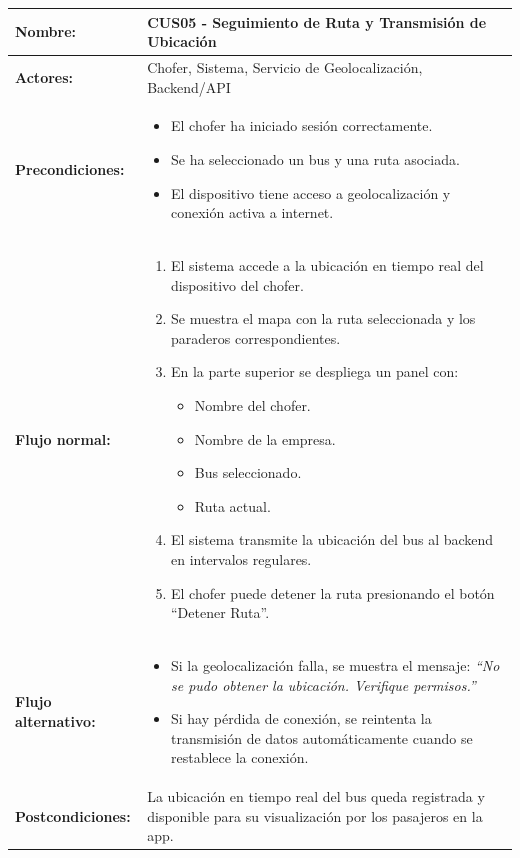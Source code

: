 \documentclass[12pt]{article}
\begin{document}
    \clearpage
    \begin{table}[!h]
    \centering
    \begin{tabular}{|p{3.5cm}|p{11cm}|}
    \hline
    \textbf{Nombre:} & CUS05 - Seguimiento de Ruta y Transmisión de Ubicación \\
    \hline
    \textbf{Actores:} & Chofer, Sistema, Servicio de Geolocalización, Backend/API \\
    \hline
    \textbf{Precondiciones:} &
    \begin{itemize}
        \item El chofer ha iniciado sesión correctamente.
        \item Se ha seleccionado un bus y una ruta asociada.
        \item El dispositivo tiene acceso a geolocalización y conexión activa a internet.
    \end{itemize}
    \\
    \hline
    \textbf{Flujo normal:} &
    \begin{enumerate}
        \item El sistema accede a la ubicación en tiempo real del dispositivo del chofer.
        \item Se muestra el mapa con la ruta seleccionada y los paraderos correspondientes.
        \item En la parte superior se despliega un panel con:
        \begin{itemize}
            \item Nombre del chofer.
            \item Nombre de la empresa.
            \item Bus seleccionado.
            \item Ruta actual.
        \end{itemize}
        \item El sistema transmite la ubicación del bus al backend en intervalos regulares.
        \item El chofer puede detener la ruta presionando el botón “Detener Ruta”.
    \end{enumerate}
    \\
    \hline
    \textbf{Flujo alternativo:} &
    \begin{itemize}
        \item[1a.] Si la geolocalización falla, se muestra el mensaje: \textit{“No se pudo obtener la ubicación. Verifique permisos.”}
        \item[4a.] Si hay pérdida de conexión, se reintenta la transmisión de datos automáticamente cuando se restablece la conexión.
    \end{itemize}
    \\
    \hline
    \textbf{Postcondiciones:} &
    La ubicación en tiempo real del bus queda registrada y disponible para su visualización por los pasajeros en la app.
    \\
    \hline
    \end{tabular}
    \end{table}
    
\end{document}

